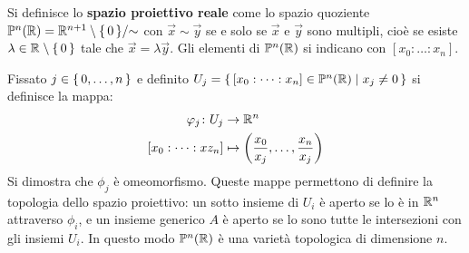 \begin{definition}
  Si definisce lo \textbf{spazio proiettivo reale} come lo spazio quoziente $ \mathbb{P}^{n} (\mathbb{R}) = {\mathbb{R}^{n+1} \setminus \set{0}} \slash {\sim} $ con
  $ \vec{x} \sim \vec{y} $ se e solo se $ \vec{x} $ e $ \vec{y} $ sono multipli,
  cioè se esiste $ \lambda \in \mathbb{R}^{} \setminus \set{0} $ tale che $ \vec{x} = \lambda \vec{y} $.
  Gli elementi di $ \mathbb{P}^{n} (\mathbb{R}) $ si indicano con $ [x_0 : \dots : x_n] $.
\end{definition}
Fissato $ j \in \set{0, \dots, n} $ e definito
$ U_j = \set{[x_0 : \dots : x_n] \in \mathbb{P}^{n} (\mathbb{R}) | x_j \not = 0 } $ si definisce la mappa:
\begin{align*}
  \varphi_j \colon U_j & \to \mathbb{R}^{n} \\
  [x_0 : \dots : xz_n] & \mapsto \left(\frac{x_0}{x_j}, \dots, \frac{x_n}{x_j}\right)
\end{align*}
Si dimostra che $ \phi_j $ è omeomorfismo. Queste mappe permettono di definire la
topologia dello spazio proiettivo: un sotto insieme di $ U_i $ è aperto se lo è
in $ \mathbb{R}^{n} $ attraverso $ \phi_i $, e un insieme generico $ A $ è aperto se lo
sono tutte le intersezioni con gli insiemi $ U_i $. In questo modo $ \mathbb{P}^{n} (\mathbb{R}) $ è
una varietà topologica di dimensione $ n $.

